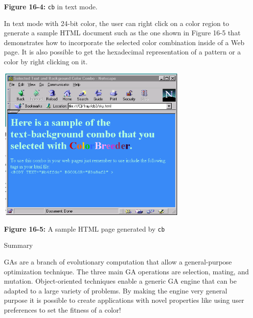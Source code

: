 {\sffamily\bfseries Figure 16-4:}
{\sffamily \texttt{cb} in text mode.}

In text mode with 24-bit color, the user can right click on a color
region to generate a sample HTML document such as the one shown in
Figure 16-5 that demonstrates how to incorporate the selected color
combination inside of a Web page. It is also possible to get the
hexadecimal representation of a pattern or a color by right clicking on
it.

\begin{center}
\includegraphics[width=3.7256in,height=3.0047in]{ub-img/ub-img49.png}
\end{center}

{\sffamily\bfseries Figure 16-5:}
{\sffamily A sample HTML page generated by \texttt{cb}}

{\sffamily Summary}

GAs are a branch of evolutionary computation that allow a
general-purpose optimization technique. The three main GA operations
are selection, mating, and mutation. Object-oriented techniques enable
a generic GA engine that can be adapted to a large variety of problems.
By making the engine very general purpose it is possible to create
applications with novel properties like using user preferences to set
the fitness of a color! 

